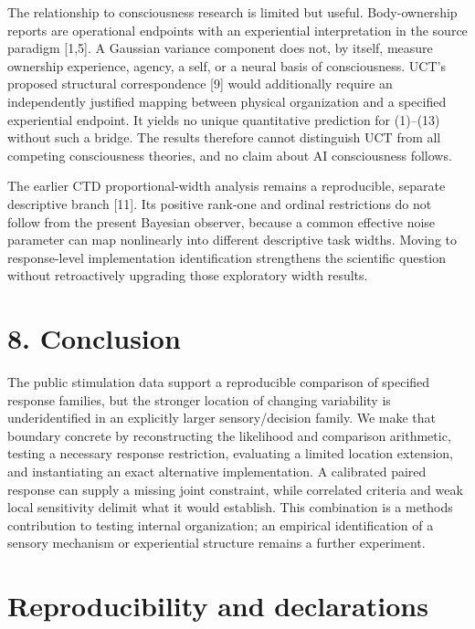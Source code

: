\documentclass[
  11pt,
]{article}
\let\ctdoldsection\section
\renewcommand{\section}{\Needspace{8\baselineskip}\ctdoldsection}
\begin{document}
The relationship to consciousness research is limited but useful.
Body-ownership reports are operational endpoints with an experiential
interpretation in the source paradigm {[}1,5{]}. A Gaussian variance
component does not, by itself, measure ownership experience, agency, a
self, or a neural basis of consciousness. UCT's proposed structural
correspondence {[}9{]} would additionally require an independently
justified mapping between physical organization and a specified
experiential endpoint. It yields no unique quantitative prediction for
(1)--(13) without such a bridge. The results therefore cannot
distinguish UCT from all competing consciousness theories, and no claim
about AI consciousness follows.

The earlier CTD proportional-width analysis remains a reproducible,
separate descriptive branch {[}11{]}. Its positive rank-one and ordinal
restrictions do not follow from the present Bayesian observer, because a
common effective noise parameter can map nonlinearly into different
descriptive task widths. Moving to response-level implementation
identification strengthens the scientific question without retroactively
upgrading those exploratory width results.

\hypertarget{conclusion}{%
\section{8. Conclusion}\label{conclusion}}

The public stimulation data support a reproducible comparison of
specified response families, but the stronger location of changing
variability is underidentified in an explicitly larger sensory/decision
family. We make that boundary concrete by reconstructing the likelihood
and comparison arithmetic, testing a necessary response restriction,
evaluating a limited location extension, and instantiating an exact
alternative implementation. A calibrated paired response can supply a
missing joint constraint, while correlated criteria and weak local
sensitivity delimit what it would establish. This combination is a
methods contribution to testing internal organization; an empirical
identification of a sensory mechanism or experiential structure remains
a further experiment.

\hypertarget{reproducibility-and-declarations}{%
\section{Reproducibility and
declarations}\label{reproducibility-and-declarations}}
\end{document}
